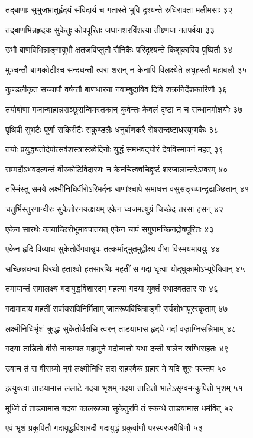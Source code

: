 तद्बाणाः सुभुजभ्रातुर्हृदयं संविदार्य च
गतास्ते भुवि दृश्यन्ते रुधिराक्ता मलीमसाः ३२

तद्बाणभिन्नहृदयः सुकेतुः कोपपूरितः
जघानशरविंशत्या तीक्ष्णया नतपर्वया ३३

उभौ बाणविभिन्नाङ्गावुभौ क्षतजविप्लुतौ
सैनिकैः परिदृश्यन्ते किंशुकाविव पुष्पितौ ३४

मुञ्चन्तौ बाणकोटीश्च सन्दधन्तौ त्वरा शरान्
न केनापि विलक्ष्येते लघुहस्तौ महाबलौ ३५

कुण्डलीकृत सच्चापौ वर्षन्तौ बाणधारया
नवाम्बुदाविव दिवि शक्रनिर्देशकारिणौ ३६

तयोर्बाणा गजान्वाहान्नराञ्छूरान्विमस्तकान्
कुर्वन्तः केवलं दृष्टा न च सन्धानमोक्षयोः ३७

पृथिवी सुभटैः पूर्णा सकिरीटैः सकुण्डलैः
धनुर्बाणकरै रोषसन्दष्टाधरयुग्मकैः ३८

तयोः प्रयुद्ध्यतोर्दर्पात्सर्वशस्त्रास्त्रवेदिनोः
युद्धं समभवद्घोरं देवविस्मापनं महत् ३९

सम्मर्दोऽभवदत्यन्तं वीरकोटिविदारणः
न केनचित्क्वचिद्दृष्टं शरजालान्तरेऽम्बरम् ४०

तस्मिंस्तु समये लक्ष्मीनिधिर्वीरोऽरिमर्दनः
बाणांश्चापे समाधत्त वसुसङ्ख्यान्दृढाञ्छितान् ४१

चतुर्भिस्तुरगान्वीरः सुकेतोरनयत्क्षयम्
एकेन ध्वजमत्युग्रं चिच्छेद तरसा हसन् ४२

एकेन सारथेः कायाच्छिरोभूमावपातयत्
एकेन चापं सगुणमच्छिनद्रोषपूरितः ४३

एकेन हृदि विव्याध सुकेतोर्वेगवान्नृपः
तत्कर्माद्भुतमुद्वीक्ष्य वीरा विस्मयमाययुः ४४

सच्छिन्नधन्वा विरथो हताश्वो हतसारथिः
महतीं स गदां धृत्वा योद्घुकामोऽभ्युपेयिवान् ४५

तमायान्तं समालक्ष्य गदायुद्धविशारदम्
महत्या गदया युक्तं रथादवततार सः ४६

गदामादाय महतीं सर्वायसविनिर्मिताम्
जातरूपविचित्राङ्गीं सर्वशोभापुरस्कृताम् ४७

लक्ष्मीनिधिर्भृशं क्रुद्धः सुकेतोर्वक्षसि त्वरन्
ताडयामास हृदये गदां वज्राग्निसन्निभाम् ४८

गदया ताडितो वीरो नाकम्पत महामुने
मदोन्मत्तो यथा दन्ती बालेन स्रग्भिराहतः ४९

उवाच तं स वीराग्र्यो नृपं लक्ष्मीनिधिं तदा
सहस्वैकं प्रहारं मे यदि शूरः परन्तप ५०

इत्युक्त्वा ताडयामास ललाटे गदया भृशम्
गदया ताडितो भालेऽसृग्वमन्कुपितो भृशम् ५१

मूर्ध्नि तं ताडयामास गदया कालरूपया
सुकेतुरपि तं स्कन्धे ताडयामास धर्मवित् ५२

एवं भृशं प्रकुपितौ गदायुद्धविशारदौ
गदायुद्धं प्रकुर्वाणौ परस्परजयैषिणौ ५३

